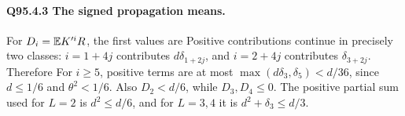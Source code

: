 \paragraph{Q95.4.3 The signed propagation means.}
For \(D_i=\allowbreak \mathbb E K'^iR\), the first values are
Positive contributions continue in precisely two classes:
\(i=\allowbreak 1+4j\) contributes \(d\delta_{1+2j}\), and \(i=\allowbreak 2+4j\) contributes
\(\delta_{3+2j}\). Therefore
For \(i\ge\allowbreak 5\), positive terms are at most
\(\max(d\delta_3,\allowbreak \delta_5)<\allowbreak d/36\), since \(d\le\allowbreak 1/6\) and
\(\theta^2<\allowbreak 1/6\). Also \(D_2<\allowbreak d/6\), while \(D_3,\allowbreak D_4\le\allowbreak 0\).
The positive partial sum used for \(L=\allowbreak 2\) is \(d^2\le\allowbreak  d/6\), and
for \(L=\allowbreak 3,\allowbreak 4\) it is \(d^2+\delta_3\le\allowbreak  d/3\).

